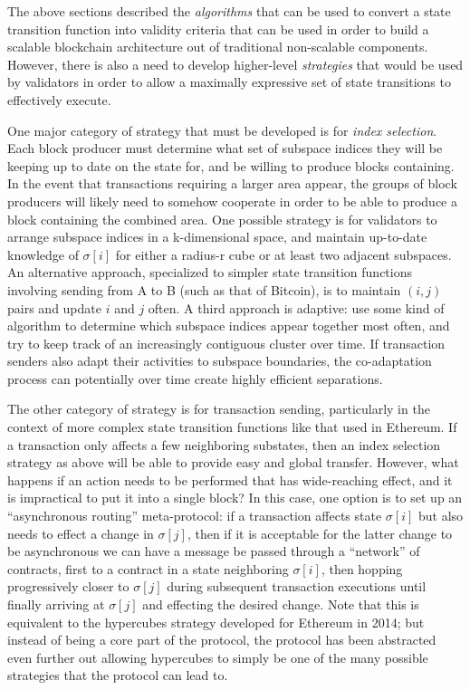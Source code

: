 \documentclass[11pt,a4paper]{report}
\theoremstyle{plain}
\theoremstyle{definition}
\theoremstyle{remark}
\begin{document}
The above sections described the \emph{algorithms} that can be used to convert a state transition function into validity criteria that can be used in order to build a scalable blockchain architecture out of traditional non-scalable components. However, there is also a need to develop higher-level \emph{strategies} that would be used by validators in order to allow a maximally expressive set of state transitions to effectively execute.

One major category of strategy that must be developed is for \emph{index selection}. Each block producer must determine what set of subspace indices they will be keeping up to date on the state for, and be willing to produce blocks containing. In the event that transactions requiring a larger area appear, the groups of block producers will likely need to somehow cooperate in order to be able to produce a block containing the combined area. One possible strategy is for validators to arrange subspace indices in a k-dimensional space, and maintain up-to-date knowledge of $\sigma[i]$ for either a radius-r cube or at least two adjacent subspaces. An alternative approach, specialized to simpler state transition functions involving sending from A to B (such as that of Bitcoin), is to maintain $(i, j)$ pairs and update $i$ and $j$ often. A third approach is adaptive: use some kind of algorithm to determine which subspace indices appear together most often, and try to keep track of an increasingly contiguous cluster over time. If transaction senders also adapt their activities to subspace boundaries, the co-adaptation process can potentially over time create highly efficient separations.

The other category of strategy is for transaction sending, particularly in the context of more complex state transition functions like that used in Ethereum. If a transaction only affects a few neighboring substates, then an index selection strategy as above will be able to provide easy and global transfer. However, what happens if an action needs to be performed that has wide-reaching effect, and it is impractical to put it into a single block? In this case, one option is to set up an ``asynchronous routing'' meta-protocol: if a transaction affects state $\sigma[i]$ but also needs to effect a change in $\sigma[j]$, then if it is acceptable for the latter change to be asynchronous we can have a message be passed through a ``network'' of contracts, first to a contract in a state neighboring $\sigma[i]$, then hopping progressively closer to $\sigma[j]$ during subsequent transaction executions until finally arriving at $\sigma[j]$ and effecting the desired change. Note that this is equivalent to the hypercubes \cite{hypercubes} strategy developed for Ethereum in 2014; but instead of being a core part of the protocol, the protocol has been abstracted even further out allowing hypercubes to simply be one of the many possible strategies that the protocol can lead to.
\end{document}
